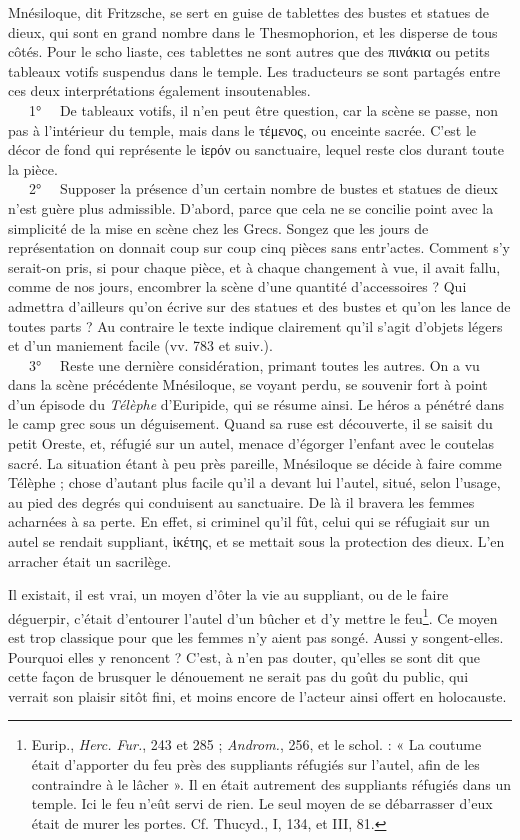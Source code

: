 \documentclass{book}%
\newcommand{\italique}[1]{\textit{#1}}%
\newcommand{\note}[1]{\footnote{#1}}
\begin{document}
Mnésiloque, dit Fritzsche, se sert en guise de tablettes des bustes et statues de dieux, qui sont en grand nombre dans le Thesmophorion, et les disperse de tous côtés. Pour le scho liaste, ces tablettes ne sont autres que des πινάκια ou petits tableaux votifs suspendus dans le temple. 
Les traducteurs se sont partagés entre ces deux interprétations également insoutenables. \\
\ \ \ 1° \ \ De tableaux votifs, il n'en peut être question, car la scène se passe, non pas à l'intérieur du temple, mais dans le τέμενος, ou enceinte sacrée. C'est le décor de fond qui représente le ἱερόν ou sanctuaire, lequel reste clos durant toute la pièce. \\
\ \ \ 2° \ \ Supposer la présence d'un certain nombre de bustes et statues de dieux n'est guère plus admissible. D'abord, parce que cela ne se concilie point avec la simplicité de la mise en scène chez les Grecs. Songez que les jours de représentation on donnait coup sur coup cinq pièces sans entr'actes. Comment s'y serait-on pris, si pour chaque pièce, et à chaque changement à vue, il avait fallu, comme de nos jours, encombrer la scène d'une quantité d'accessoires ? 
Qui admettra d'ailleurs qu'on écrive sur des statues et des bustes et qu'on les lance de toutes parts ? Au contraire le texte indique clairement qu'il s'agit d'objets légers et d'un maniement facile (vv. 783 et suiv.). \\
\ \ \ 3° \ \ Reste une dernière considération, primant toutes les autres. On a vu dans la scène précédente Mnésiloque, se voyant perdu, se souvenir fort à point d'un épisode du \italique{Télèphe} d'Euripide, qui se résume ainsi. Le héros a pénétré dans le camp grec sous un déguisement. Quand sa ruse est découverte, il se saisit du petit Oreste, et, réfugié sur un autel, menace d'égorger l'enfant avec le coutelas sacré. La situation étant à peu près pareille, Mnésiloque se décide à faire comme Télèphe ; chose d'autant plus facile qu'il a devant lui l'autel, situé, selon l'usage, au pied des degrés qui conduisent au sanctuaire. 
De là il bravera les femmes acharnées à sa perte. En effet, si criminel qu'il fût, celui qui se réfugiait sur un autel se rendait suppliant, ἱκέτης, et se mettait sous la protection des dieux. L'en arracher était un sacrilège. 

Il existait, il est vrai, un moyen d'ôter la vie au suppliant, ou de le faire déguerpir, c'était d'entourer l'autel d'un bûcher et d'y mettre le feu\note{Eurip., \italique{Herc. Fur.}, 243 et 285 ; \italique{Androm.}, 256, et le schol. : « La coutume était d'apporter du feu près des suppliants réfugiés sur l'autel, afin de les contraindre à le lâcher ». Il en était autrement des suppliants réfugiés dans un temple. Ici le feu n'eût servi de rien. Le seul moyen de se débarrasser d'eux était de murer les portes. Cf. Thucyd., I, 134, et III, 81.}. 
Ce moyen est trop classique pour que les femmes n'y aient pas songé. Aussi y songent-elles. Pourquoi elles y renoncent ? C'est, à n'en pas douter, qu'elles se sont dit que cette façon de brusquer le dénouement ne serait pas du goût du public, qui verrait son plaisir sitôt fini, et moins encore de l'acteur ainsi offert en holocauste. 
\end{document}
